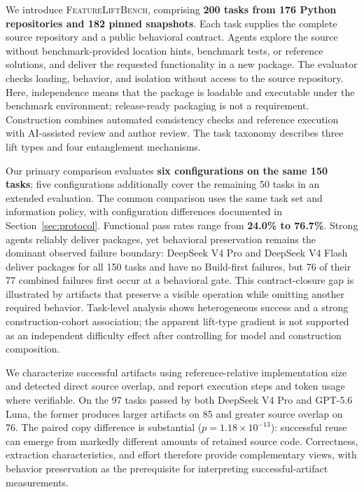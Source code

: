 \documentclass[acmsmall,screen,review,anonymous,nonacm]{acmart}
\newcommand{\flb}{\textsc{FeatureLiftBench}\xspace}
\begin{document}
We introduce \flb, comprising \textbf{200 tasks from 176 Python repositories
and 182 pinned snapshots}. Each task supplies the complete source repository
and a public behavioral contract. Agents explore the source without
benchmark-provided location hints, benchmark tests, or reference solutions,
and deliver the requested functionality in a new package. The evaluator checks
loading, behavior, and isolation without access to the source repository.
Here, independence means that the package is loadable and executable under the
benchmark environment; release-ready packaging is not a requirement.
Construction combines automated consistency checks and reference execution
with AI-assisted review and author review. The task taxonomy describes
three lift types and four entanglement mechanisms.

Our primary comparison evaluates \textbf{six configurations on the same
150 tasks}; five configurations additionally cover the remaining 50 tasks in
an extended evaluation. The common comparison uses the same task set and
information policy, with configuration differences documented in
Section~\ref{sec:protocol}. Functional pass rates range from
\textbf{24.0\% to 76.7\%}. Strong agents reliably deliver packages, yet
behavioral preservation remains the dominant observed failure boundary:
DeepSeek V4 Pro and DeepSeek V4 Flash deliver packages for all 150 tasks and
have no Build-first failures, but 76 of their 77 combined failures first occur
at a behavioral gate. This contract-closure gap is illustrated by artifacts that preserve a visible
operation while omitting another required behavior. Task-level analysis shows
heterogeneous success and a strong construction-cohort association; the apparent
lift-type gradient is not supported as an independent difficulty effect after
controlling for model and construction composition.

We characterize successful artifacts using reference-relative implementation
size and detected direct source overlap, and report execution steps and token
usage where verifiable. On the 97 tasks passed
by both DeepSeek V4 Pro and GPT-5.6 Luna, the former produces larger artifacts
on 85 and greater source overlap on 76. The paired copy difference is substantial ($p=1.18\times10^{-13}$): successful
reuse can emerge from markedly different amounts of retained source code.
Correctness, extraction characteristics, and effort therefore provide
complementary views, with behavior preservation as the prerequisite for
interpreting successful-artifact measurements.
\end{document}
